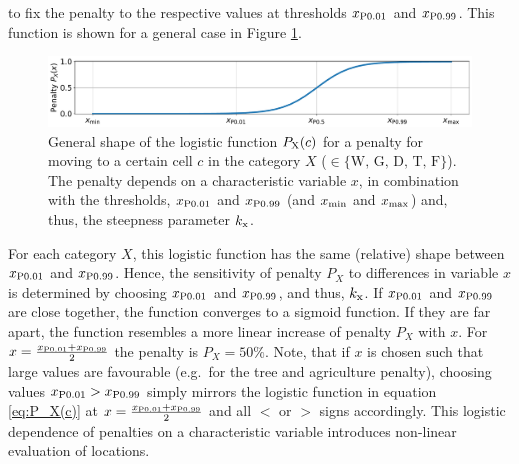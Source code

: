 to fix the penalty to the respective values at thresholds $x_{\rm P0.01}$ and $x_{\rm P0.99}$.
This function is shown for a general case in Figure \ref{fig:logF}.
\begin{figure}
	\centering
	\includegraphics[width=\textwidth]{images/general_logF.pdf}
	\caption{General shape of the logistic function $P_{\rm X}(c)$ for a penalty for moving to a certain cell $c$ in the category $X$ ($\in\{\text{W, G, D, T, F}\}$). The penalty depends on a characteristic variable $x$, in combination with the thresholds, $x_{\rm P0.01}$ and $x_{\rm P0.99}$ (and $x_{\rm min}$ and $x_{\rm max}$) and, thus, the steepness parameter $k_{\rm x}$.}
	\label{fig:logF}
\end{figure}
For each category $X$, this logistic function has the same (relative) shape between $x_{\rm P0.01}$ and $x_{\rm P0.99}$. %
Hence, the sensitivity of penalty $P_X$ to differences in variable $x$ is determined by choosing $x_{\rm P0.01}$ and $x_{\rm P0.99}$, and thus, $k_{\rm x}$.
If $x_{\rm P0.01}$ and $x_{\rm P0.99}$ are close together, the function converges to a sigmoid function. 
If they are far apart, the function resembles a more linear increase of penalty $P_X$ with $x$.
For $x=\frac{x_{\rm P0.01} + x_{\rm P0.99}}{2}$ the penalty is $P_X = 50\%$.
Note, that if $x$ is chosen such that large values are favourable (e.g.\ for the tree and agriculture penalty), choosing values $x_{\rm P0.01}>x_{\rm P0.99}$ simply mirrors the logistic function in equation \ref{eq:P_X(c)} at $x=\frac{x_{\rm P0.01}+x_{\rm P0.99}}{2}$ and all $<$ or $>$ signs accordingly.
This logistic dependence of penalties on a characteristic variable introduces non-linear evaluation of locations.


